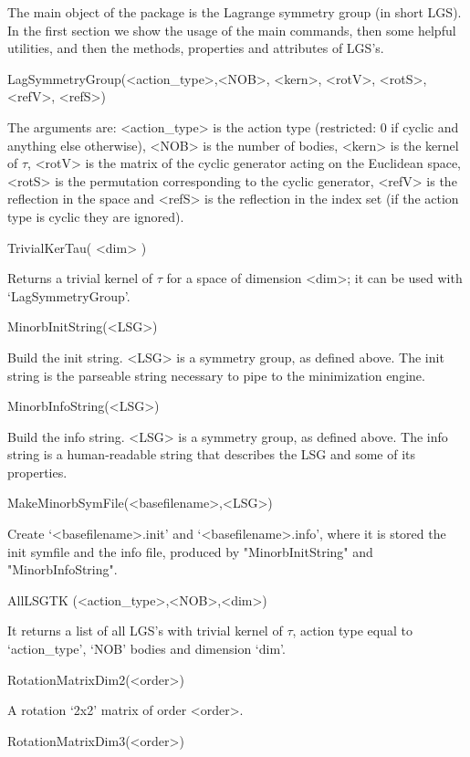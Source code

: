 
The main object of the package is the 
Lagrange symmetry group (in short LGS). 
In the first section we show the usage of the main commands,
then some helpful utilities, and then 
the methods, properties and attributes of LGS's. 


\> LagSymmetryGroup(<action_type>,<NOB>, <kern>, <rotV>, <rotS>, <refV>, <refS>)

The arguments are: <action_type> is the action type
(restricted: 0 if cyclic and anything else otherwise),
<NOB> is the number of bodies,
<kern> is the kernel of $\tau$, <rotV> is 
the matrix of the cyclic generator acting on the Euclidean space,
<rotS> is the permutation corresponding to the cyclic generator,
<refV> is the reflection in the space
and <refS> is the reflection in the index set (if the action
type is cyclic they are ignored).

\> TrivialKerTau( <dim> )

Returns a trivial kernel of $\tau$ for a space of dimension
<dim>; it can be used with `LagSymmetryGroup'.


\> MinorbInitString(<LSG>)

Build the init string. <LSG> is a symmetry group, as defined above.
The init string is the parseable string necessary to pipe 
to the minimization engine.

\> MinorbInfoString(<LSG>)

Build the info string. <LSG> is a symmetry group, as defined above.
The info string is a human-readable string that describes
the LSG and some of its properties.

\> MakeMinorbSymFile(<basefilename>,<LSG>)

Create `<basefilename>.init' and `<basefilename>.info',
where it is stored the init symfile and the info file, produced
by "MinorbInitString" and "MinorbInfoString".



\> AllLSGTK (<action_type>,<NOB>,<dim>)

It returns a list of all LGS's with trivial kernel of $\tau$,
action type equal to `action_type', `NOB' bodies and dimension
`dim'.



\> RotationMatrixDim2(<order>)

A rotation `2x2' matrix of order <order>.

\> RotationMatrixDim3(<order>)

